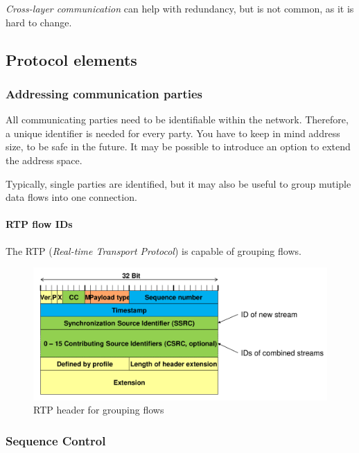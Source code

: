 \documentclass[english]{panikzettel}
\begin{document}
	\textit{Cross-layer communication} can help with redundancy, but is not common, as it is hard to change. 

	\subsection{Protocol elements}
	\label{ss-protocol-elements}
	
	\subsubsection{Addressing communication parties}
	\label{sss-addressing-communication-parties}
	
	All communicating parties need to be identifiable within the network. 
	Therefore, a unique identifier is needed for every party.
	You have to keep in mind address size, to be safe in the future.
	It may be possible to introduce an option to extend the address space.
	
	Typically, single parties are identified, but it may also be useful to group mutiple data flows into one connection.

	\paragraph{RTP flow IDs}
	\label{pgf-rtp-flow-ids}
	
	The RTP (\textit{Real-time Transport Protocol}) is capable of grouping flows.

	\begin{figure}[H]
		\centering
		\includegraphics[width=\textwidth]{img/2-rtp-flow-ids.png}
		\caption{RTP header for grouping flows}
		\label{img-2-rtp-flow-ids}
	\end{figure}

	\subsubsection{Sequence Control}
	\label{sssec-sequence-control}
	
\end{document}
